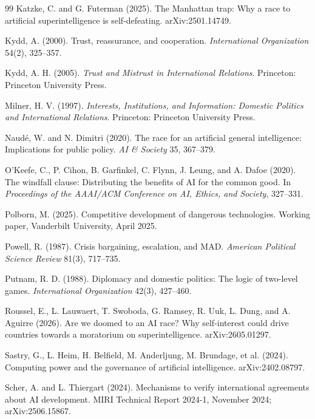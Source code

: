 \documentclass[11pt]{article}
\theoremstyle{plain}
\theoremstyle{definition}
\theoremstyle{remark}
\begin{document}
\begin{thebibliography}{99}
 Katzke, C. and G. Futerman (2025). The Manhattan trap: Why a race to artificial superintelligence is self-defeating. arXiv:2501.14749.

 Kydd, A. (2000). Trust, reassurance, and cooperation. \emph{International Organization} 54(2), 325--357.

 Kydd, A. H. (2005). \emph{Trust and Mistrust in International Relations}. Princeton: Princeton University Press.

 Milner, H. V. (1997). \emph{Interests, Institutions, and Information: Domestic Politics and International Relations}. Princeton: Princeton University Press.

 Naud\'e, W. and N. Dimitri (2020). The race for an artificial general intelligence: Implications for public policy. \emph{AI \& Society} 35, 367--379.

 O'Keefe, C., P. Cihon, B. Garfinkel, C. Flynn, J. Leung, and A. Dafoe (2020). The windfall clause: Distributing the benefits of AI for the common good. In \emph{Proceedings of the AAAI/ACM Conference on AI, Ethics, and Society}, 327--331.

 Polborn, M. (2025). Competitive development of dangerous technologies. Working paper, Vanderbilt University, April 2025.

 Powell, R. (1987). Crisis bargaining, escalation, and MAD. \emph{American Political Science Review} 81(3), 717--735.

 Putnam, R. D. (1988). Diplomacy and domestic politics: The logic of two-level games. \emph{International Organization} 42(3), 427--460.

 Roussel, E., L. Lauwaert, T. Swoboda, G. Ramsey, R. Uuk, L. Dung, and A. Aguirre (2026). Are we doomed to an AI race? Why self-interest could drive countries towards a moratorium on superintelligence. arXiv:2605.01297.

 Sastry, G., L. Heim, H. Belfield, M. Anderljung, M. Brundage, et al. (2024). Computing power and the governance of artificial intelligence. arXiv:2402.08797.

 Scher, A. and L. Thiergart (2024). Mechanisms to verify international agreements about AI development. MIRI Technical Report 2024-1, November 2024; arXiv:2506.15867.


\end{thebibliography}
\end{document}
